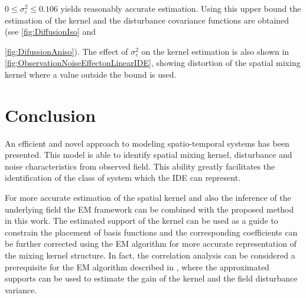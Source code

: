 \documentclass[10pt,twocolumn,twoside]{IEEEtran}
\begin{document}
$0\le\sigma_{\varepsilon}^2\le 0.106$ yields reasonably accurate estimation. Using this upper bound the estimation of the kernel and the disturbance covariance functions are obtained (see \figurename{\ref{fig:DiffusionIso}} and \figurename{\ref{fig:DifussionAniso}). The effect of $\sigma_{\varepsilon}^2$ on the kernel estimation is also shown in \figurename{\ref{fig:ObservationNoiseEffectonLinearIDE}}, showing distortion of the spatial mixing kernel where a value outside the bound is used.

\section{Conclusion}
An efficient and novel approach to modeling spatio-temporal systems has been presented. This model is able to identify spatial mixing kernel, disturbance and noise characteristics from observed field. This ability greatly facilitates the identification of the class of system which the IDE can represent.


For more accurate estimation of the spatial kernel and also the inference of the underlying field the EM framework can be combined with the proposed method in this work. The estimated support of the kernel can be  used as a guide to constrain the placement of basis functions and the corresponding coefficients can be further corrected using the EM algorithm for more accurate representation of the mixing kernel structure. In fact, the correlation analysis can be considered a prerequisite for the EM algorithm described in \cite{Dewar2009}, where the approximated supports can be used to estimate the gain of the kernel and the field disturbance variance.                                             
                                                                                                                                                                              

}
\end{document}

